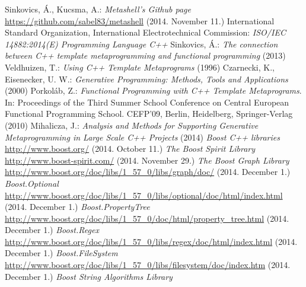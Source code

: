 
\begin{thebibliography}{99}
    Sinkovics, Á., Kucsma, A.:
    \textit{Metashell's Github page}
    \url{https://github.com/sabel83/metashell} (2014. November 11.)
    International Standard Organization, International Electrotechnical
    Commission: \textit{ISO/IEC 14882:2014(E) Programming Language C++}
    Sinkovics, Á.:
    \textit{The connection between C++ template metaprogramming and functional
    programming} (2013)
    Veldhuizen, T.:
    \textit{ Using C++ Template Metaprograms} (1996)
    Czarnecki, K., Eisenecker, U. W.:
    \textit{Generative Programming: Methods, Tools and Applications} (2000)
    Porkoláb, Z.:
    \textit{Functional Programming with C++ Template Metaprograms}.
    In: Proceedings of the Third Summer School Conference on
    Central European Functional Programming School. CEFP’09, Berlin,
    Heidelberg, Springer-Verlag (2010)
    Mihalicza, J.:
    \textit{Analysis and Methods for Supporting Generative Metaprogramming in
    Large Scale C++ Projects} (2014)
    \textit{Boost C++ libraries} \\
    \url{http://www.boost.org/} (2014. October 11.)
    \textit{The Boost Spirit Library} \\
    \url{http://www.boost-spirit.com/} (2014. November 29.)
    \textit{The Boost Graph Library} \\
    \url{http://www.boost.org/doc/libs/1_57_0/libs/graph/doc/}
    (2014. December 1.)
    \textit{Boost.Optional} \\
    \url{http://www.boost.org/doc/libs/1_57_0/libs/optional/doc/html/index.html}
    (2014. December 1.)
    \textit{Boost.PropertyTree} \\
    \url{http://www.boost.org/doc/libs/1_57_0/doc/html/property_tree.html}
    (2014. December 1.)
    \textit{Boost.Regex} \\
    \url{http://www.boost.org/doc/libs/1_57_0/libs/regex/doc/html/index.html}
    (2014. December 1.)
    \textit{Boost.FileSystem} \\
    \url{http://www.boost.org/doc/libs/1_57_0/libs/filesystem/doc/index.htm}
    (2014. December 1.)
    \textit{Boost String Algorithms Library} \\

\end{thebibliography}
